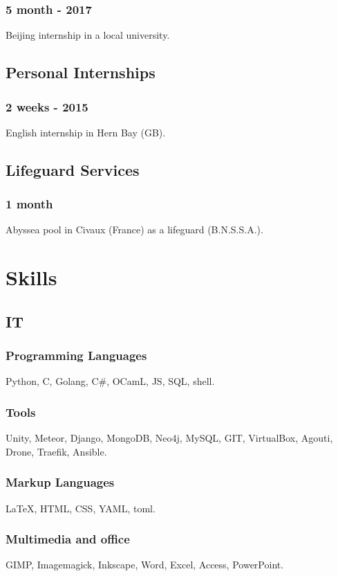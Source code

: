 \documentclass{article}
\begin{document}
\begin{multicols}{2}
                \subsubsection{5 month - 2017}
                    Beijing internship in a local university.
            \subsection{Personal Internships}
                \subsubsection{2 weeks - 2015}
                    English internship in Hern Bay (GB).
            \subsection{Lifeguard Services}
                \subsubsection{1 month}
                    Abyssea pool in Civaux (France) as a lifeguard (B.N.S.S.A.).

        \columnbreak

        \section{Skills}
            \subsection{IT}
                \subsubsection{Programming Languages}
                    Python, C, Golang, C\#, OCamL, JS, SQL, shell.
                \subsubsection{Tools}
                    Unity, Meteor, Django,  MongoDB, Neo4j, MySQL, GIT, VirtualBox, Agouti, Drone, Traefik, Ansible.
                \subsubsection{Markup Languages}
                    {\LaTeX}, HTML, CSS, YAML, toml.
                \subsubsection{Multimedia and office}
                    GIMP, Imagemagick, Inkscape, Word, Excel, Access, PowerPoint.

\end{multicols}
\end{document}
